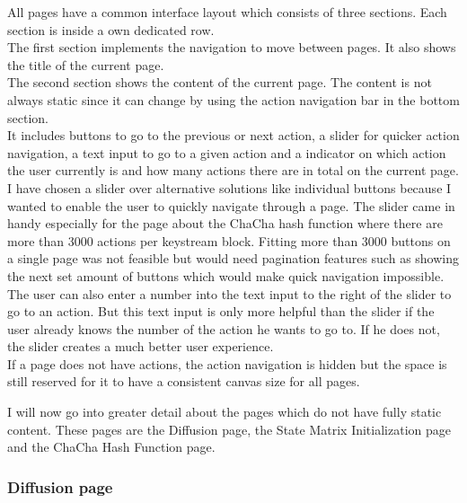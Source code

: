 All pages have a common interface layout which consists of three sections. Each section is inside a own dedicated row. \\
The first section implements the navigation to move between pages. It also shows the title of the current page. \\
The second section shows the content of the current page. The content is not always static since it can change by using the action navigation bar in the bottom section.  \\
It includes buttons to go to the previous or next action, a slider for quicker action navigation, a text input to go to a given action and a indicator on which action the user currently is and how many actions there are in total on the current page. \\
I have chosen a slider over alternative solutions like individual buttons because I wanted to enable the user to quickly navigate through a page. The slider came in handy especially for the page about the ChaCha hash function where there are more than 3000 actions per keystream block. Fitting more than 3000 buttons on a single page was not feasible but would need pagination features such as showing the next set amount of buttons which would make quick navigation impossible. \\
The user can also enter a  number into the text input to the right of the slider to go to an action. But this text input is only more helpful than the slider if the user already knows the number of the action he wants to go to. If he does not, the slider creates a much better user experience. \\
If a page does not have actions, the action navigation is hidden but the space is still reserved for it to have a consistent canvas size for all pages.

I will now go into greater detail about the pages which do not have fully static content. These pages are the Diffusion page, the State Matrix Initialization page and the ChaCha Hash Function page.

\subsubsection{Diffusion page}

